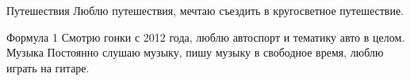 



\begin{cvskills}
  \cvskill
    {Путешествия} %
    {Люблю путешествия, мечтаю съездить в кругосветное путешествие.} %

  \cvskill
    {Формула 1} %
    {Смотрю гонки с 2012 года, люблю автоспорт и тематику авто в целом.} %
  \cvskill
    {Музыка} %
    {Постоянно слушаю музыку, пишу музыку в свободное время, люблю играть на гитаре.} %

\end{cvskills}